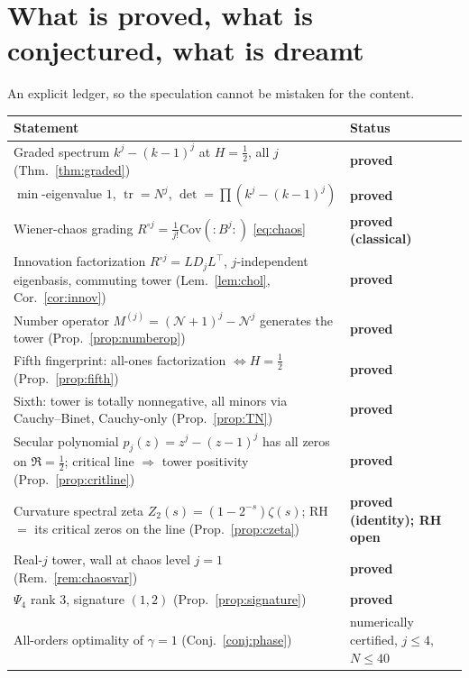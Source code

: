 \documentclass[11pt,reqno]{amsart}
\theoremstyle{plain}
\theoremstyle{definition}
\theoremstyle{remark}
\newcommand{\Had}{\circ}
\DeclareMathOperator{\tr}{tr}
\begin{document}
\section{What is proved, what is conjectured, what is dreamt}
\label{sec:ledger}

An explicit ledger, so the speculation cannot be mistaken for the
content.

\begin{center}
\begin{tabular}{p{}l}
\hline
Statement & Status\\
\hline
Graded spectrum $k^j-(k-1)^j$ at $H=\tfrac12$, all $j$
(Thm.~\ref{thm:graded}) & \textbf{proved}\\
$\min$-eigenvalue $1$, $\tr=N^j$, $\det=\prod(k^j-(k-1)^j)$ &
\textbf{proved}\\
Wiener-chaos grading $R^{\Had j}=\tfrac1{j!}\mathrm{Cov}(:\!B^j\!:)$
\eqref{eq:chaos} & \textbf{proved (classical)}\\
Innovation factorization $R^{\Had j}=LD_jL^{\top}$, $j$-independent
eigenbasis, commuting tower (Lem.~\ref{lem:chol}, Cor.~\ref{cor:innov}) &
\textbf{proved}\\
Number operator $M^{(j)}=(\mathcal N+1)^j-\mathcal N^j$ generates the
tower (Prop.~\ref{prop:numberop}) & \textbf{proved}\\
Fifth fingerprint: all-ones factorization $\Leftrightarrow H=\tfrac12$
(Prop.~\ref{prop:fifth}) & \textbf{proved}\\
Sixth: tower is totally nonnegative, all minors via Cauchy--Binet,
Cauchy-only (Prop.~\ref{prop:TN}) & \textbf{proved}\\
Secular polynomial $p_j(z)=z^j-(z-1)^j$ has all zeros on $\Re=\tfrac12$;
critical line $\Rightarrow$ tower positivity (Prop.~\ref{prop:critline}) &
\textbf{proved}\\
Curvature spectral zeta $Z_2(s)=(1-2^{-s})\zeta(s)$; RH $=$ its critical
zeros on the line (Prop.~\ref{prop:czeta}) & \textbf{proved (identity);
RH open}\\
Real-$j$ tower, wall at chaos level $j=1$ (Rem.~\ref{rem:chaosvar}) &
\textbf{proved}\\
$\Psi_4$ rank $3$, signature $(1,2)$ (Prop.~\ref{prop:signature}) &
\textbf{proved}\\
All-orders optimality of $\gamma=1$ (Conj.~\ref{conj:phase}) &
numerically certified, $j\le4$, $N\le40$\\

\end{tabular}
\end{center}
\end{document}
